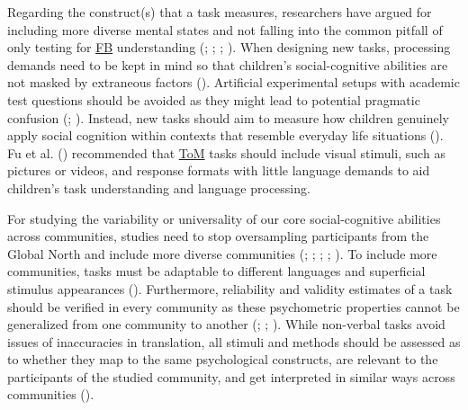 \documentclass[
]{scrbook}
\begin{document}
Regarding the construct(s) that a task measures, researchers have argued for including more diverse mental states and not falling into the common pitfall of only testing for \hyperref[acronyms_FB]{FB} understanding (; ; ; ). When designing new tasks, processing demands need to be kept in mind so that children's social-cognitive abilities are not masked by extraneous factors (). Artificial experimental setups with academic test questions should be avoided as they might lead to potential pragmatic confusion (; ). Instead, new tasks should aim to measure how children genuinely apply social cognition within contexts that resemble everyday life situations (). Fu et al. () recommended that \hyperref[acronyms_ToM]{ToM} tasks should include visual stimuli, such as pictures or videos, and response formats with little language demands to aid children's task understanding and language processing.

For studying the variability or universality of our core social-cognitive abilities across communities, studies need to stop oversampling participants from the Global North and include more diverse communities (; ; ; ; ). To include more communities, tasks must be adaptable to different languages and superficial stimulus appearances (). Furthermore, reliability and validity estimates of a task should be verified in every community as these psychometric properties cannot be generalized from one community to another (; ; ). While non-verbal tasks avoid issues of inaccuracies in translation, all stimuli and methods should be assessed as to whether they map to the same psychological constructs, are relevant to the participants of the studied community, and get interpreted in similar ways across communities ().
\end{document}

